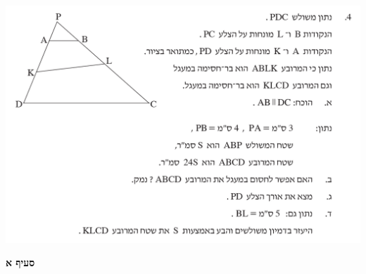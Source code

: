 \documentclass[12pt,a4paper]{article}
\begin{document}
\begin{center}
\includegraphics[width=\textwidth]{summer-2016b-4}
\end{center}
\vspace{-7mm}
\textbf{סעיף א}
\end{document}
